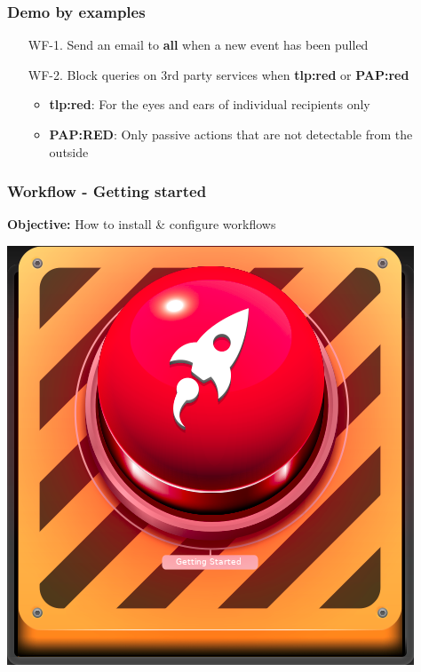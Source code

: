 \begin{frame}
    \frametitle{Demo by examples}
    \begin{enumerate}
        \item[WF-1.] Send an email to \textbf{all} when a new event has been pulled
        \vspace*{2em}
        \item[WF-2.] Block queries on 3rd party services when \textbf{tlp:red} or \textbf{PAP:red}
        \begin{itemize}
            \item \textbf{tlp:red}: For the eyes and ears of individual recipients only
            \item \textbf{PAP:RED}: Only passive actions that are not detectable from the outside
        \end{itemize}
    \end{enumerate}
\end{frame}

\begin{frame}
    \frametitle{
        \huge
        Workflow - Getting started
        \vspace{1em}
    }
    \textbf{Objective:} How to install \& configure workflows
    \begin{center}
        \includegraphics[width=0.2\linewidth]{pictures/getting-started}
    \end{center}
\end{frame}

